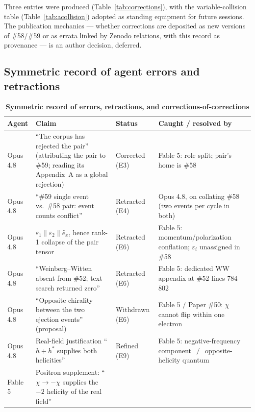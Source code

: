 \documentclass[%
 reprint, amsmath,amssymb, aps, prb, ]{revtex4-2}
\numberwithin{equation}{section}
\begin{document}
Three entries were produced (Table~\ref{tab:corrections}), with the variable-collision table (Table~\ref{tab:acollision}) adopted as standing equipment for future sessions. The publication mechanics --- whether corrections are deposited as new versions of \#58/\#59 or as errata linked by Zenodo relations, with this record as provenance --- is an author decision, deferred.

\subsection{Symmetric record of agent errors and retractions}
\label{sec:errors}

\begin{table}[t!]
\centering
\caption{\textbf{Symmetric record of errors, retractions, and corrections-of-corrections}}
\label{tab:errors}
\renewcommand{\arraystretch}{1.4}
\begin{tabular}{p{1.8cm}p{6.6cm}p{2.6cm}p{3.6cm}}
\toprule
\textbf{Agent} & \textbf{Claim} & \textbf{Status} & \textbf{Caught / resolved by} \\
\midrule
Opus 4.8
& ``The corpus has rejected the pair'' (attributing the pair to \#59; reading its Appendix~A as a global rejection)
& Corrected (E3)
& Fable 5: role split; pair's home is \#58 \\
\addlinespace[0.3cm]
Opus 4.8
& ``\#59 single event vs.\ \#58 pair: event counts conflict''
& Retracted (E4)
& Opus 4.8, on collating \#58 (two events per cycle in both) \\
\addlinespace[0.3cm]
Opus 4.8
& $\varepsilon_1\parallel\varepsilon_2\parallel\hat e_x$, hence rank-1 collapse of the pair tensor
& Retracted (E6)
& Fable 5: momentum/polarization conflation; $\varepsilon_i$ unassigned in \#58 \\
\addlinespace[0.3cm]
Opus 4.8
& ``Weinberg--Witten absent from \#52; text search returned zero''
& Retracted (E6)
& Fable 5: dedicated WW appendix at \#52 lines 784--802 \\
\addlinespace[0.3cm]
Opus 4.8
& ``Opposite chirality between the two ejection events'' (proposal)
& Withdrawn (E6)
& Fable 5 / Paper \#50: $\chi$ cannot flip within one electron \\
\addlinespace[0.3cm]
Opus 4.8
& Real-field justification ``$h+h^{*}$ supplies both helicities''
& Refined (E9)
& Fable 5: negative-frequency component $\neq$ opposite-helicity quantum \\
\addlinespace[0.3cm]
Fable 5
& Positron supplement: ``$\chi\to-\chi$ supplies the $-2$ helicity of the real field''

\end{tabular}
\end{table}
\end{document}
